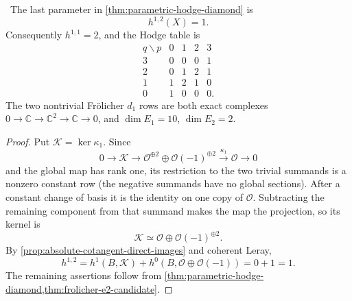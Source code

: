 \begin{corollary}
\label{cor:exact-hodge-diamond}
\Verified\ The last parameter in
\cref{thm:parametric-hodge-diamond} is
\[
 h^{1,2}(X)=1.
\]
Consequently $h^{1,1}=2$, and the Hodge table is
\[
\begin{array}{c|cccc}
q\backslash p&0&1&2&3\\ \hline
3&0&0&0&1\\
2&0&1&2&1\\
1&1&2&1&0\\
0&1&0&0&0.
\end{array}
\]
The two nontrivial Fr\"olicher $d_1$ rows are both exact complexes
$0\to\mathbb C\to\mathbb C^2\to\mathbb C\to0$, and
$\dim E_1=10$, $\dim E_2=2$.
\end{corollary}

\begin{proof}
Put $\mathcal K=\ker\kappa_1$.  Since
\[
0\longrightarrow\mathcal K\longrightarrow
\mathcal O^{\oplus2}\oplus\mathcal O(-1)^{\oplus2}
\xrightarrow{\kappa_1}\mathcal O\longrightarrow0
\]
and the global map has rank one, its restriction to the two trivial summands
is a nonzero constant row (the negative summands have no global sections).
After a constant change of basis it is the identity on one copy of
$\mathcal O$.  Subtracting the remaining component from that summand makes
the map the projection, so its kernel is
\[
 \mathcal K\simeq\mathcal O\oplus\mathcal O(-1)^{\oplus2}.
\]
By 
\cref{prop:absolute-cotangent-direct-images} and coherent Leray,
\[
 h^{1,2}=h^1(B,\mathcal K)
 +h^0(B,\mathcal O\oplus\mathcal O(-1))=0+1=1.
\]
The remaining assertions follow from
\cref{thm:parametric-hodge-diamond,thm:frolicher-e2-candidate}.
\end{proof}
